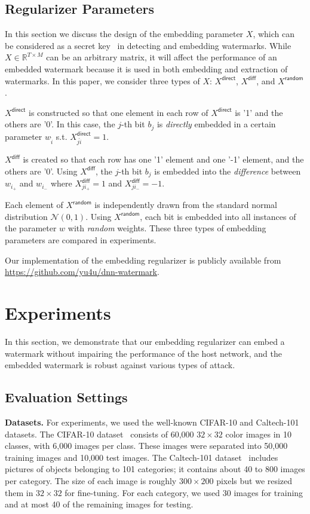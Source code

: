 \documentclass[10pt,twocolumn,letterpaper]{article}
\begin{document}
\subsection{Regularizer Parameters}
\label{sec:param}
In this section we discuss the design of the embedding parameter $X$, which can be considered as a secret key~\cite{Hartung_ieee99} in detecting and embedding watermarks.
While $X \in \mathbb{R}^{T{\times}M}$ can be an arbitrary matrix, it will affect the performance of an embedded watermark because it is used in both embedding and extraction of watermarks.
In this paper, we consider three types of $X$: $X^{\textsf{direct}}$, $X^{\textsf{diff}}$, and $X^{\textsf{random}}$.

$X^{\textsf{direct}}$ is constructed so that one element in each row of $X^{\textsf{direct}}$ is '1' and the others are '0'.
In this case, the $j$-th bit $b_j$ is \textit{directly} embedded in a certain parameter $w_{\hat{i}}$ s.t. $X^{\textsf{direct}}_{j\hat{i}} = 1$.

$X^{\textsf{diff}}$ is created so that each row has one '1' element and one '-1' element, and the others are '0'.
Using $X^{\textsf{diff}}$, the $j$-th bit $b_j$ is embedded into the \textit{difference} between $w_{i_+}$ and $w_{i_-}$ where $X^{\textsf{diff}}_{ji_+}=1$ and $X^{\textsf{diff}}_{ji_-}=-1$.

Each element of $X^{\textsf{random}}$ is independently drawn from the standard normal distribution $\mathcal{N}(0, 1)$.
Using $X^{\textsf{random}}$, each bit is embedded into all instances of the parameter $w$ with \textit{random} weights.
These three types of embedding parameters are compared in experiments.

Our implementation of the embedding regularizer is publicly available from \url{https://github.com/yu4u/dnn-watermark}.


\section{Experiments}
In this section, we demonstrate that our embedding regularizer can embed a watermark without impairing the performance of the host network, and the embedded watermark is robust against various types of attack.

\subsection{Evaluation Settings}

\textbf{Datasets.}
For experiments, we used the well-known CIFAR-10 and Caltech-101 datasets.
The CIFAR-10 dataset~\cite{kri_tech09} consists of 60,000 $32 \times 32$ color images in 10 classes, with 6,000 images per class.
These images were separated into 50,000 training images and 10,000 test images.
The Caltech-101 dataset~\cite{fei_gmbv04} includes pictures of objects belonging to 101 categories; it contains about 40 to 800 images per category.
The size of each image is roughly $300 \times 200$ pixels but we resized them in $32 \times 32$ for fine-tuning.
For each category, we used 30 images for training and at most 40 of the remaining images for testing.
\end{document}
